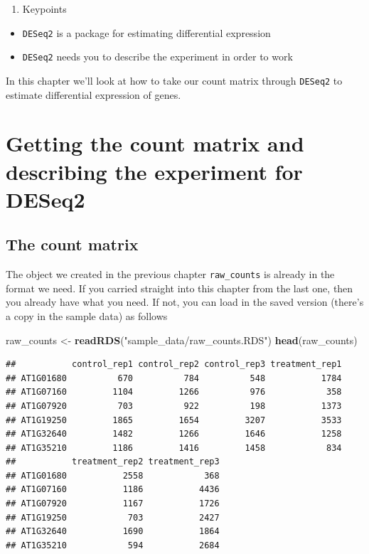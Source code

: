\documentclass[]{book}
\newenvironment{Shaded}{\begin{snugshade}}{\end{snugshade}}
\newcommand{\KeywordTok}[1]{\textcolor[rgb]{0.13,0.29,0.53}{\textbf{#1}}}
\newcommand{\NormalTok}[1]{#1}
\newcommand{\StringTok}[1]{\textcolor[rgb]{0.31,0.60,0.02}{#1}}
\providecommand{\tightlist}{%
  \setlength{\itemsep}{0pt}\setlength{\parskip}{0pt}}
\begin{document}
\begin{enumerate}
\def\labelenumi{\arabic{enumi}.}
\setcounter{enumi}{2}
\tightlist
\item
  Keypoints
\end{enumerate}

\begin{itemize}
\tightlist
\item
  \texttt{DESeq2} is a package for estimating differential expression
\item
  \texttt{DESeq2} needs you to describe the experiment in order to work
\end{itemize}

In this chapter we'll look at how to take our count matrix through \texttt{DESeq2} to estimate differential expression of genes.

\hypertarget{getting-the-count-matrix-and-describing-the-experiment-for-deseq2}{%
\section{Getting the count matrix and describing the experiment for DESeq2}\label{getting-the-count-matrix-and-describing-the-experiment-for-deseq2}}

\hypertarget{the-count-matrix}{%
\subsection{The count matrix}\label{the-count-matrix}}

The object we created in the previous chapter \texttt{raw\_counts} is already in the format we need. If you carried straight into this chapter from the last one, then you already have what you need. If not, you can load in the saved version (there's a copy in the sample data) as follows

\begin{Shaded}
\begin{Highlighting}[]
\NormalTok{raw_counts <-}\StringTok{ }\KeywordTok{readRDS}\NormalTok{(}\StringTok{"sample_data/raw_counts.RDS"}\NormalTok{)}
\KeywordTok{head}\NormalTok{(raw_counts)}
\end{Highlighting}
\end{Shaded}

\begin{verbatim}
##           control_rep1 control_rep2 control_rep3 treatment_rep1
## AT1G01680          670          784          548           1784
## AT1G07160         1104         1266          976            358
## AT1G07920          703          922          198           1373
## AT1G19250         1865         1654         3207           3533
## AT1G32640         1482         1266         1646           1258
## AT1G35210         1186         1416         1458            834
##           treatment_rep2 treatment_rep3
## AT1G01680           2558            368
## AT1G07160           1186           4436
## AT1G07920           1167           1726
## AT1G19250            703           2427
## AT1G32640           1690           1864
## AT1G35210            594           2684
\end{verbatim}
\end{document}
